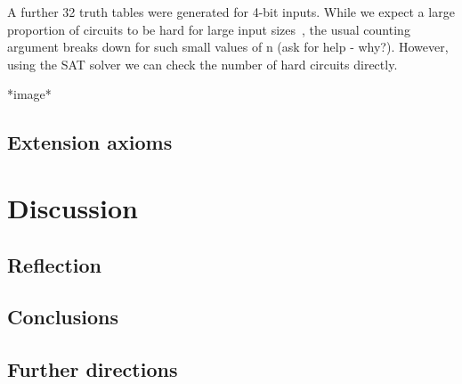 \documentclass{article}
\begin{document}
A further 32 truth tables were generated for 4-bit inputs. While we expect a large proportion of circuits to be hard for large input sizes~\cite{arora}, the usual counting argument breaks down for such small values of n (ask for help - why?). However, using the SAT solver we can check the number of hard circuits directly.

*image*

\subsection{Extension axioms}

\section{Discussion}

\subsection{Reflection}

\subsection{Conclusions}

\subsection{Further directions}

 

\end{document}
